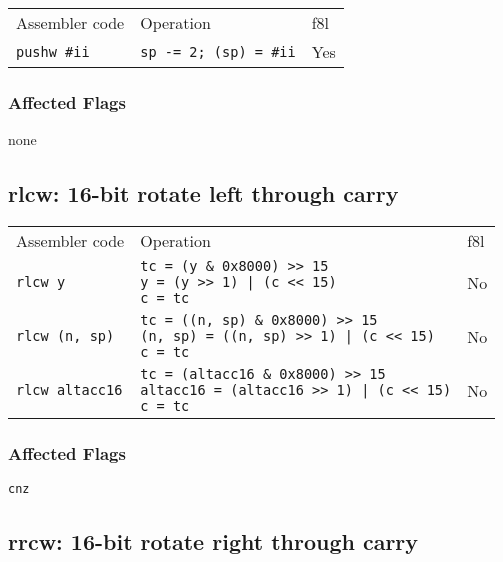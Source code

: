 \documentclass{book}
\begin{document}
\begin{tabular}{l l l}
Assembler code      & Operation                     & f8l \\
\texttt{pushw \#ii} & \texttt{sp -= 2; (sp) = \#ii} & Yes \\
\end{tabular}

\subsubsection*{Affected Flags}

none

\subsection{rlcw: 16-bit rotate left through carry}

\begin{tabular}{l l l}
Assembler code         & Operation                                                                                                             & f8l \\
\texttt{rlcw y}        & \makecell{\texttt{tc = (y \& 0x8000) >> 15}\\\texttt{y = (y >> 1) | (c << 15)}\\\texttt{c = tc}}                      & No \\
\texttt{rlcw (n, sp)}  & \makecell{\texttt{tc = ((n, sp) \& 0x8000) >> 15}\\\texttt{(n, sp) = ((n, sp) >> 1) | (c << 15)}\\\texttt{c = tc}}    & No \\
\texttt{rlcw altacc16} & \makecell{\texttt{tc = (altacc16 \& 0x8000) >> 15}\\\texttt{altacc16 = (altacc16 >> 1) | (c << 15)}\\\texttt{c = tc}} & No
\end{tabular}

\subsubsection*{Affected Flags}

\texttt{cnz}


\subsection{rrcw: 16-bit rotate right through carry}
\end{document}
